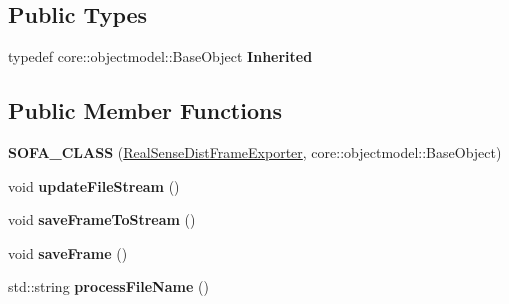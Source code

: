 \subsection*{Public Types}
\begin{DoxyCompactItemize}
\item 
\mbox{\label{classsofa_1_1rgbdtracking_1_1_real_sense_dist_frame_exporter_a3d5e841c18a10910a89dcaa8fafcaa53}} 
typedef core\+::objectmodel\+::\+Base\+Object {\bfseries Inherited}
\end{DoxyCompactItemize}
\subsection*{Public Member Functions}
\begin{DoxyCompactItemize}
\item 
\mbox{\label{classsofa_1_1rgbdtracking_1_1_real_sense_dist_frame_exporter_a4e09a848d4afe49248391a934c051eb5}} 
{\bfseries S\+O\+F\+A\+\_\+\+C\+L\+A\+SS} (\hyperlink{classsofa_1_1rgbdtracking_1_1_real_sense_dist_frame_exporter}{Real\+Sense\+Dist\+Frame\+Exporter}, core\+::objectmodel\+::\+Base\+Object)
\item 
\mbox{\label{classsofa_1_1rgbdtracking_1_1_real_sense_dist_frame_exporter_af0422eedd90f9e7b8c5b17c33994a39c}} 
void {\bfseries update\+File\+Stream} ()
\item 
\mbox{\label{classsofa_1_1rgbdtracking_1_1_real_sense_dist_frame_exporter_a97e36488ae57725cf05f28c1d70b18a3}} 
void {\bfseries save\+Frame\+To\+Stream} ()
\item 
\mbox{\label{classsofa_1_1rgbdtracking_1_1_real_sense_dist_frame_exporter_ab788c5084fff8f6e8ee0d7b000af871b}} 
void {\bfseries save\+Frame} ()
\item 
\mbox{\label{classsofa_1_1rgbdtracking_1_1_real_sense_dist_frame_exporter_aa5ebbe273df7d13fe9a8f648aa624d1c}} 
std\+::string {\bfseries process\+File\+Name} ()
\end{DoxyCompactItemize}
